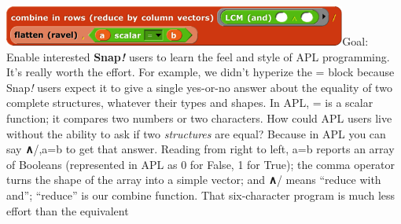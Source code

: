 \includegraphics[width=4.45139in,height=0.52083in]{media/image1263.png}Goal:~
Enable interested \textbf{Snap\emph{!}} users to learn the feel and
style of APL programming. It's really worth the effort. For example, we
didn't hyperize the = block because Snap\emph{!} users expect it to give
a single yes-or-no answer about the equality of two complete structures,
whatever their types and shapes. In APL, = is a scalar function; it
compares two numbers or two characters. How could APL users live without
the ability to ask if two \emph{structures} are equal? Because in APL
you can say \textbf{∧}/,a=b to get that answer. Reading from right to
left, a=b reports an array of Booleans (represented in APL as 0 for
False, 1 for True); the comma operator turns the shape of the array into
a simple vector; and \textbf{∧}/ means ``reduce with and''; ``reduce''
is our combine function. That six-character program is much less effort
than the equivalent

